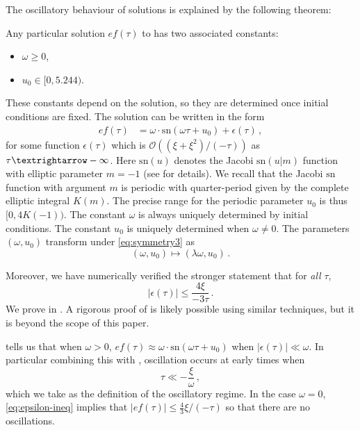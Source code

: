 The oscillatory behaviour of solutions is explained by the following theorem: 
\begin{thm}
\label{thm:oscillatory}Any particular solution $ef(\tau)$ to  has two associated constants: 
\begin{itemize}
\item $\omega\geq0$, 
\item $u_{0}\in[0,5.244)$. 
\end{itemize}
These constants depend on the solution, so they are determined once initial conditions are fixed. The solution can be written in the form 
\begin{align}
ef(\tau) & =\omega\cdot\mathrm{sn}(\omega\tau+u_{0})+\epsilon(\tau)\,,\label{eq:approx-quartic}
\end{align}
for some function $\epsilon(\tau)$ which is $\mathcal{O}((\xi+\xi^{2})/(-\tau))$ as $\tau\textrightarrow-\infty$. Here $\mathrm{sn}(u)$ denotes the Jacobi $\mathrm{sn}(u|m)$ function with elliptic parameter $m=-1$ (see  for details). We recall that the Jacobi $\mathrm{sn}$ function with argument $m$ is periodic with quarter-period given by the complete elliptic integral $K(m)$. The precise range for the periodic parameter $u_{0}$ is thus $[0,4K(-1))$. The constant $\omega$ is always uniquely determined by initial conditions. The constant $u_{0}$ is uniquely determined when $\omega\neq0$. The parameters $(\omega,u_{0})$ transform under \eqref{eq:symmetry3} as 
\begin{equation}
(\omega,u_{0})\mapsto(\lambda\omega,u_{0})\,.\label{eq:ic-transform}
\end{equation}
\end{thm}

Moreover, we have numerically verified the stronger statement that for \emph{all} $\tau$, 
\begin{equation}
\left|\epsilon(\tau)\right|\leq\frac{4\xi}{-3\tau}\,.\label{eq:epsilon-ineq}
\end{equation}
We prove  in . A rigorous proof of  is likely possible using similar techniques, but it is beyond the scope of this paper. 

 tells us that when $\omega>0$, $ef(\tau)\approx\omega\cdot\mathrm{sn}(\omega\tau+u_{0})$ when $\left|\epsilon(\tau)\right|\ll\omega$. In particular combining this with , oscillation occurs at early times when 
\begin{equation}
\tau\ll-\frac{\xi}{\omega}\,,\label{eq:osc-from-omega}
\end{equation}
which we take as the definition of the oscillatory regime. In the case $\omega=0$, \eqref{eq:epsilon-ineq} implies that $|ef(\tau)|\leq\tfrac{4}{3}\xi/(-\tau)$ so that there are no oscillations.

